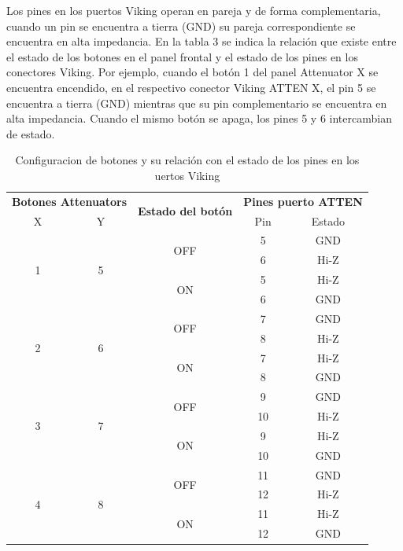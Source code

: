 Los pines en los puertos Viking operan en pareja y de forma complementaria, cuando un pin se encuentra a tierra (GND) su pareja correspondiente se encuentra en alta impedancia. En la tabla 3 se indica la relación que existe  entre el estado de los botones en el panel frontal y el estado de los pines en los conectores Viking. Por ejemplo, cuando el botón 1 del panel Attenuator X se encuentra encendido, en el respectivo conector Viking ATTEN X, el pin 5 se encuentra a tierra (GND) mientras que su pin complementario se encuentra en alta impedancia. Cuando el mismo botón se apaga, los pines 5 y 6 intercambian de estado.

\begin{table}[h!]
	\centering
	\begin{tabular}{ccccc}
		\toprule
		\multicolumn{2}{c}{\bfseries Botones Attenuators} &
		\multirow{2}{*}{\bfseries Estado del botón} & 
		\multicolumn{2}{c}{\bfseries Pines puerto ATTEN} \\
		X & Y &			& Pin & Estado \\
		\midrule
		\multirow{4}{*}{1} & \multirow{4}{*}{5} 
			& \multirow{2}{*}{OFF}    & 5 & GND		\\
			&  &                      & 6 & Hi-Z	\\
			&  & \multirow{2}{*}{ON}  & 5 & Hi-Z	\\
			&  &                      & 6 & GND		\\
		\midrule			
		\multirow{4}{*}{2} & \multirow{4}{*}{6} 
		& \multirow{2}{*}{OFF}    & 7 & GND		\\
		&  &                      & 8 & Hi-Z	\\
		&  & \multirow{2}{*}{ON}  & 7 & Hi-Z	\\
		&  &                      & 8 & GND		\\
		\midrule			
		\multirow{4}{*}{3} & \multirow{4}{*}{7} 
		& \multirow{2}{*}{OFF}    &  9 & GND		\\
		&  &                      & 10 & Hi-Z	\\
		&  & \multirow{2}{*}{ON}  &  9 & Hi-Z	\\
		&  &                      & 10 & GND	\\		
		\midrule			
		\multirow{4}{*}{4} & \multirow{4}{*}{8} 
		& \multirow{2}{*}{OFF}    & 11 & GND		\\
		&  &                      & 12 & Hi-Z	\\
		&  & \multirow{2}{*}{ON}  & 11 & Hi-Z	\\
		&  &                      & 12 & GND	\\				
		\bottomrule
	\end{tabular}
	\caption{Configuracion de botones y su relación con el estado de los pines en los uertos Viking}
	\label{Tab:RelacionBotonesEstodoPinesViking11713}
\end{table}

